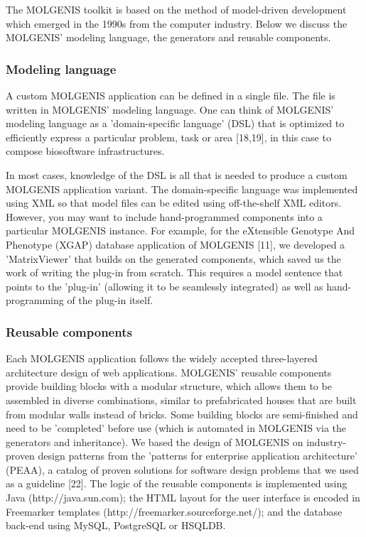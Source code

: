 The MOLGENIS toolkit is based on the method of model-driven development which emerged in the 1990s 
from the computer industry. Below we discuss the MOLGENIS' modeling language, the generators and 
reusable components. 

\subsubsection{Modeling language}
A custom MOLGENIS application can be defined in a single file. The file is written in MOLGENIS' 
modeling language. One can think of MOLGENIS' modeling language as a 'domain-specific language' 
(DSL) that is optimized to efficiently express a particular problem, task or area [18,19], in this case to 
compose biosoftware infrastructures.

In most cases, knowledge of the DSL is all that is needed to produce a custom MOLGENIS application 
variant. The domain-specific language was implemented using XML so that model files can be edited 
using off-the-shelf XML editors. However, you may want to include hand-programmed components into 
a particular MOLGENIS instance. For example, for the eXtensible Genotype And Phenotype (XGAP) 
database application of MOLGENIS [11], we developed a 'MatrixViewer' that builds on the generated 
components, which saved us the work of writing the plug-in from scratch. This requires a model 
sentence that points to the 'plug-in' (allowing it to be seamlessly integrated) as well as 
hand-programming of the plug-in itself.

\subsubsection{Reusable components}
Each MOLGENIS application follows the widely accepted three-layered architecture design of web 
applications. MOLGENIS' reusable components provide building blocks with a modular structure, which 
allows them to be assembled in diverse combinations, similar to prefabricated houses that are built 
from modular walls instead of bricks. Some building blocks are semi-finished and need to be 
'completed' before use (which is automated in MOLGENIS via the generators and inheritance). We based 
the design of MOLGENIS on industry-proven design patterns from the 'patterns for enterprise 
application architecture' (PEAA), a catalog of proven solutions for software design problems 
that we used as a guideline [22]. The logic of the reusable components is implemented using 
Java (http://java.sun.com); the HTML layout for the user interface is encoded in Freemarker 
templates (http://freemarker.sourceforge.net/); and the database back-end using MySQL, PostgreSQL 
or HSQLDB.

